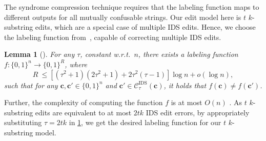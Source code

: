 \documentclass[onecolumn]{IEEEtran}
\newtheorem{lemma}{Lemma}
\newcommand{\bl}{n}
\newcommand{\numedits}{t}
\newcommand{\editsize}{k}
\newcommand{\confball}[3]{\mathcal{C}_{#1}^{#2}(#3)}
\newcommand{\insdel}{IDS\xspace}
\newcommand{\tksub}{$\numedits$ $\editsize$-substring\xspace}
\newcommand{\vr}[1]{{\color{red} {\small [VR: #1]} }}
\begin{document}
The syndrome compression technique requires that the labeling function maps to different outputs for all mutually confusable strings. Our edit model here is \tksub edits, which are a special case of multiple \insdel edits. Hence, we choose the labeling function from~\cite{Sima_optimal_t_del_code}, capable of correcting multiple \insdel edits.
\begin{lemma}[{\protect\cite[Section~5]{Sima_optimal_t_del_code}}]
\label{lem:edit code}
    For any $\tau$, constant w.r.t.\ $\bl$, there exists a labeling function $f:\{0,1\}^\bl \to \{0,1\}^R$, where $$R~\leq [(\tau^2+1)(2\tau^2+1)+2\tau^2(\tau-1)]\log\bl + o(\log\bl),$$ such that for any $\mathbf{c}, \mathbf{c}' \in \{0,1\}^\bl$ and  $\mathbf{c}' \in \confball{\tau}{\mathrm{\insdel}}{\mathbf{c}}$, it holds that $f(\mathbf{c})\neq f(\mathbf{c}')$. 
\end{lemma}

Further, the complexity of computing the function $f$ is at most $O(\bl)$ \cite{Sima_optimal_t_del_code}.
As $\numedits$ $\editsize$-substring edits are equivalent to at most $2\numedits\editsize$ \insdel edit errors, by appropriately substituting $\tau = 2\numedits\editsize$ in \cref{lem:edit code}, we get the desired labeling function for our \tksub model. 
\end{document}
